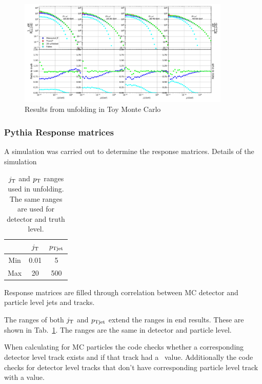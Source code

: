 \begin{figure}
\centering
\includegraphics[width=0.9\textwidth]{figures/analysis/ToyMCUnfolder_300k_events.pdf}
\caption{Results from unfolding in Toy Monte Carlo}
\label{fig:toymc}
\end{figure}

\subsubsection{Pythia Response matrices}
A  simulation was carried out to determine the response matrices. 
{\color{red} Details of the simulation}
\begin{table}
\centering
\caption{$j_{\rm T}$ and $p_{\rm T}$ ranges used in unfolding. The same ranges are used for detector and truth level.}
\label{tab:unfranges}
\begin{tabular}{c | c | c}
 & $j_{\rm T}$ & $p_{\rm Tjet}$ \\
 \hline
Min & 0.01 & 5 \\
Max & 20 & 500 \\
\hline
\end{tabular}
\end{table}

Response matrices are filled through correlation between MC detector and particle level jets and tracks.

The ranges of both $j_{\rm T}$ and $p_{\rm Tjet}$ extend the ranges in end results. These are shown in Tab.~\ref{tab:unfranges}. The ranges are the same in detector and particle level.

When calculating \jt{} for MC particles the code checks whether a corresponding detector level track exists and if that track had a \jt{} value. Additionally the code checks for detector level tracks that don't have corresponding particle level track with a \jt{} value.


